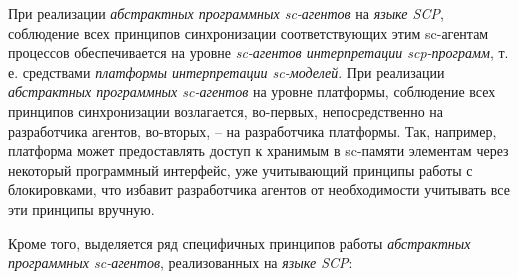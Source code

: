 При реализации \textit{абстрактных программных sc-агентов} на \textit{языке SCP}, соблюдение всех принципов синхронизации соответствующих этим sc-агентам процессов обеспечивается на уровне \textit{sc-агентов интерпретации scp-программ}, т. е. средствами \textit{платформы интерпретации sc-моделей}. При реализации \textit{абстрактных программных sc-агентов} на уровне платформы, соблюдение всех принципов синхронизации возлагается, во-первых, непосредственно на разработчика агентов, во-вторых, -- на разработчика платформы. Так, например, платформа может предоставлять доступ к хранимым в sc-памяти элементам через некоторый программный интерфейс, уже учитывающий принципы работы с блокировками, что избавит разработчика агентов от необходимости учитывать все эти принципы вручную.

Кроме того, выделяется ряд специфичных принципов работы \textit{абстрактных программных sc-агентов}, реализованных на \textit{языке SCP}:
